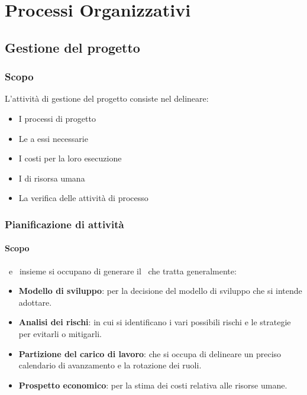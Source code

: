 \section{Processi Organizzativi}

    \subsection{Gestione del progetto}

	    \subsubsection{Scopo}
	    L'attività di gestione del progetto consiste nel delineare:
	    \begin{itemize}
	    	\item I processi di progetto
	    	\item Le  a essi necessarie
	    	\item I costi per la loro esecuzione
	    	\item I  di risorsa umana
	    	\item La verifica delle attività di processo
	    \end{itemize}


		\subsubsection{Pianificazione di attività}

			\paragraph{Scopo}
			\Res\ e \Amm\ insieme si occupano di generare il \PdP\ che tratta generalmente:
			\begin{itemize}
				\item \textbf{Modello di sviluppo}: per la decisione del modello di sviluppo che si intende adottare.
				\item \textbf{Analisi dei rischi}: in cui si identificano i vari possibili rischi e le strategie per evitarli o mitigarli.
				\item \textbf{Partizione del carico di lavoro}: che si occupa di delineare un preciso calendario di avanzamento e la rotazione dei ruoli.
				\item \textbf{Prospetto economico}: per la stima dei costi relativa alle risorse umane.
			\end{itemize}

